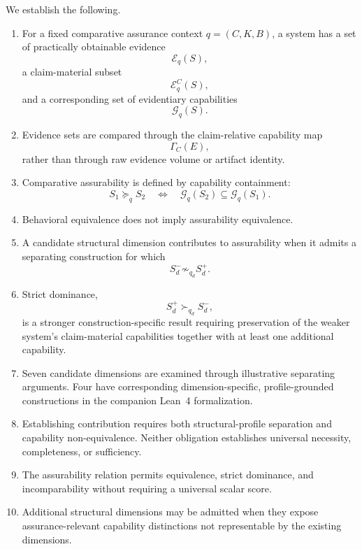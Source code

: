 We establish the following.

\begin{enumerate}

  \item For a fixed comparative assurance
        context \(q=(C,K,B)\),
        a system has a set of practically obtainable evidence
        \[
          \mathcal{E}_q(S),
        \]
        a claim-material subset
        \[
          \mathcal{E}^{C}_q(S),
        \]
        and a corresponding set of evidentiary capabilities
        \[
          \mathcal{G}_q(S).
        \]

  \item Evidence sets are compared through the claim-relative capability map
        \[
          \Gamma_C(E),
        \]
        rather than through raw evidence volume or artifact identity.

  \item Comparative assurability is defined by capability containment:
        \[
          S_1\succeq_q S_2
          \quad\Longleftrightarrow\quad
          \mathcal{G}_q(S_2)
          \subseteq
          \mathcal{G}_q(S_1).
        \]

  \item Behavioral equivalence does not imply assurability equivalence.

  \item A candidate structural dimension contributes to assurability when it admits a separating construction for which
        \[
          S_d^{-}
          \not\sim_{q_d}
          S_d^{+}.
        \]

  \item Strict dominance,
        \[
          S_d^{+}\succ_{q_d}S_d^{-},
        \]
        is a stronger construction-specific result requiring preservation
        of the weaker system's claim-material capabilities together with at least one additional capability.

  \item Seven candidate dimensions are examined through illustrative
        separating arguments. Four have corresponding
        dimension-specific, profile-grounded constructions in
        the companion Lean~4 formalization.

  \item Establishing contribution requires both structural-profile
        separation and capability non-equivalence.
        Neither obligation establishes universal necessity,
        completeness, or sufficiency.

  \item The assurability relation permits equivalence, strict dominance, and incomparability without requiring a universal scalar score.

  \item Additional structural dimensions may be admitted when they expose assurance-relevant capability distinctions not representable by the existing dimensions.

\end{enumerate}

